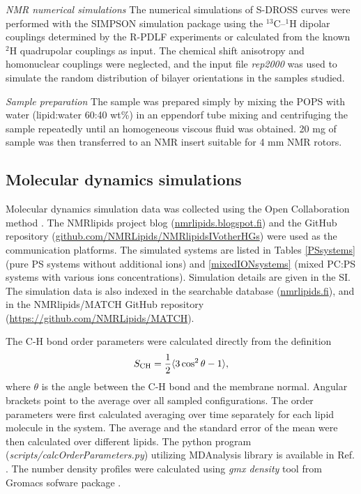 \documentclass[aps,prl,superscriptaddress,twocolumn]{revtex4}
\begin{document}
\emph{NMR numerical simulations}
The numerical simulations of S-DROSS curves were performed with the SIMPSON simulation package \cite{bak00} using the $^{13}$C--$^1$H
dipolar couplings determined by the R-PDLF experiments or calculated from the known $^2$H quadrupolar couplings \cite{browning80} as input.
The chemical shift anisotropy and homonuclear couplings were neglected, and the input file {\it{rep2000}} was used to simulate the random
distribution of bilayer orientations in the samples studied.

\emph{Sample preparation}
The sample was prepared simply by mixing the POPS with water (lipid:water 60:40 wt\%) in an eppendorf
tube mixing and centrifuging the sample repeatedly until an homogeneous viscous fluid was obtained.
20 mg of sample was then transferred to an NMR insert suitable for 4 mm NMR rotors.  


\subsection{Molecular dynamics simulations}
Molecular dynamics simulation data was collected using
the Open Collaboration method \cite{botan15}.
The NMRlipids project blog (\url{nmrlipids.blogspot.fi}) and
the GitHub repository (\url{github.com/NMRLipids/NMRlipidsIVotherHGs})
were used as the communication platforms.
The simulated systems are listed in 
Tables \ref{PSsystems} (pure PS systems without additional ions) 
and \ref{mixedIONsystems} (mixed PC:PS systems with various ions concentrations).
Simulation details are given in the SI.
The simulation data is also indexed in the
searchable database (\url{nmrlipids.fi}),
and in the NMRlipids/MATCH GitHub repository (\url{https://github.com/NMRLipids/MATCH}).

The C-H bond order parameters were calculated directly
from the definition
\begin{equation}
S_{\rm CH}=\frac{1}{2}\langle 3\cos^2\theta -1 \rangle,
\end{equation}
where $\theta$ is the angle between the C-H bond and the membrane normal.
Angular brackets point to the average over all sampled configurations.
The order parameters were first calculated averaging over time separately
for each lipid molecule in the system. The average and
the standard error of the mean were then calculated over different lipids.
The python program ({\it scripts/calcOrderParameters.py}) utilizing
MDAnalysis library \cite{agrawal11,gowers16} is available in Ref. . 
The number density profiles were calculated using {\it gmx density} tool
from Gromacs sofware package \cite{gromacsMANUAL}.
\end{document}
